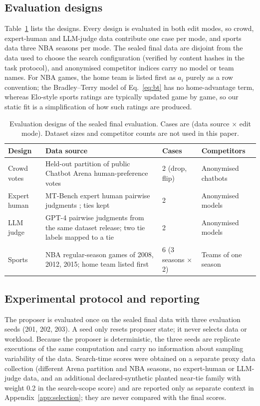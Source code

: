 \documentclass{article}
\begin{document}
\subsection{Evaluation designs}
\label{sec:designs}
Table~\ref{tab:designs} lists the designs. Every design is evaluated in both edit modes, so crowd, expert-human and LLM-judge data contribute one case per mode, and sports data three NBA seasons per mode. The sealed final data are disjoint from the data used to choose the search configuration (verified by content hashes in the task protocol), and anonymised competitor indices carry no model or team names. For NBA games, the home team is listed first as $a_i$ purely as a row convention; the Bradley--Terry model of Eq.~\eqref{eq:bt} has no home-advantage term, whereas Elo-style sports ratings \citep{Szczecinski2020GElo,Holy2026ScoreDriven} are typically updated game by game, so our static fit is a simplification of how such ratings are produced. %

\begin{table}[t]
\centering
\caption{Evaluation designs of the sealed final evaluation. Cases are (data source $\times$ edit mode). Dataset sizes and competitor counts are not used in this paper.}
\label{tab:designs}
\small
\begin{tabular}{p{2.0cm}p{5.5cm}p{1.5cm}p{2.7cm}}
\toprule
Design & Data source & Cases & Competitors \\
\midrule
Crowd votes & Held-out partition of public Chatbot Arena human-preference votes \citep{Chiang2024Chatbot} & 2 (drop, flip) & Anonymised chatbots \\
Expert human & MT-Bench expert human pairwise judgments \citep{Zheng2023Judging}; ties kept & 2 & Anonymised models \\
LLM judge & GPT-4 pairwise judgments from the same dataset release; two tie labels mapped to a tie & 2 & Anonymised models \\
Sports & NBA regular-season games of 2008, 2012, 2015; home team listed first & 6 (3 seasons $\times$ 2) & Teams of one season \\
\bottomrule
\end{tabular}
\end{table}

\subsection{Experimental protocol and reporting}
The proposer is evaluated once on the sealed final data with three evaluation seeds (201, 202, 203). A seed only resets proposer state; it never selects data or workload. Because the proposer is deterministic, the three seeds are replicate executions of the same computation and carry no information about sampling variability of the data. Search-time scores were obtained on a separate proxy data collection (different Arena partition and NBA seasons, no expert-human or LLM-judge data, and an additional declared-synthetic planted near-tie family with weight 0.2 in the search-scope score) and are reported only as separate context in Appendix~\ref{app:selection}; they are never compared with the final scores.
\end{document}
